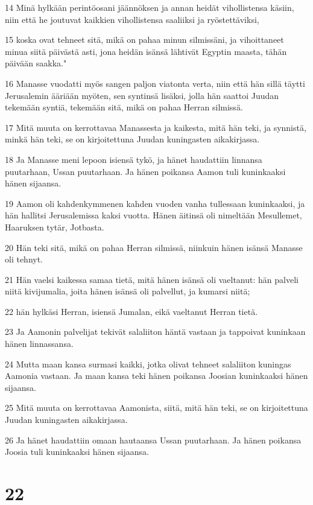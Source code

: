 \par 14 Minä hylkään perintöosani jäännöksen ja annan heidät vihollistensa käsiin, niin että he joutuvat kaikkien vihollistensa saaliiksi ja ryöstettäviksi,
\par 15 koska ovat tehneet sitä, mikä on pahaa minun silmissäni, ja vihoittaneet minua siitä päivästä asti, jona heidän isänsä lähtivät Egyptin maasta, tähän päivään saakka."
\par 16 Manasse vuodatti myös sangen paljon viatonta verta, niin että hän sillä täytti Jerusalemin ääriään myöten, sen syntinsä lisäksi, jolla hän saattoi Juudan tekemään syntiä, tekemään sitä, mikä on pahaa Herran silmissä.
\par 17 Mitä muuta on kerrottavaa Manassesta ja kaikesta, mitä hän teki, ja synnistä, minkä hän teki, se on kirjoitettuna Juudan kuningasten aikakirjassa.
\par 18 Ja Manasse meni lepoon isiensä tykö, ja hänet haudattiin linnansa puutarhaan, Ussan puutarhaan. Ja hänen poikansa Aamon tuli kuninkaaksi hänen sijaansa.
\par 19 Aamon oli kahdenkymmenen kahden vuoden vanha tullessaan kuninkaaksi, ja hän hallitsi Jerusalemissa kaksi vuotta. Hänen äitinsä oli nimeltään Mesullemet, Haaruksen tytär, Jotbasta.
\par 20 Hän teki sitä, mikä on pahaa Herran silmissä, niinkuin hänen isänsä Manasse oli tehnyt.
\par 21 Hän vaelsi kaikessa samaa tietä, mitä hänen isänsä oli vaeltanut: hän palveli niitä kivijumalia, joita hänen isänsä oli palvellut, ja kumarsi niitä;
\par 22 hän hylkäsi Herran, isiensä Jumalan, eikä vaeltanut Herran tietä.
\par 23 Ja Aamonin palvelijat tekivät salaliiton häntä vastaan ja tappoivat kuninkaan hänen linnassansa.
\par 24 Mutta maan kansa surmasi kaikki, jotka olivat tehneet salaliiton kuningas Aamonia vastaan. Ja maan kansa teki hänen poikansa Joosian kuninkaaksi hänen sijaansa.
\par 25 Mitä muuta on kerrottavaa Aamonista, siitä, mitä hän teki, se on kirjoitettuna Juudan kuningasten aikakirjassa.
\par 26 Ja hänet haudattiin omaan hautaansa Ussan puutarhaan. Ja hänen poikansa Joosia tuli kuninkaaksi hänen sijaansa.

\chapter{22}

